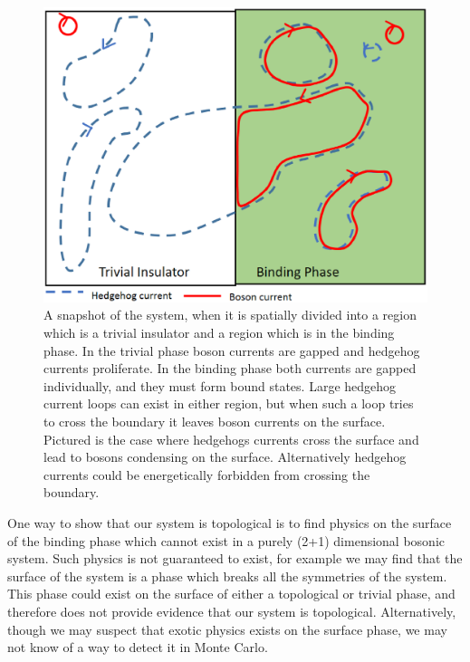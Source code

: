 \documentclass[prb,twocolumn]{revtex4-1}
\begin{document}
\begin{figure}
\includegraphics[angle=-90,width=0.9\linewidth]{figures/surface.eps}
\caption{A snapshot of the system, when it is spatially divided into a region which is a trivial insulator and a region which is in the binding phase. In the trivial phase boson currents are gapped and hedgehog currents proliferate. In the binding phase both currents are gapped individually, and they must form bound states. Large hedgehog current loops can exist in either region, but when such a loop tries to cross the boundary it leaves boson currents on the surface. Pictured is the case where hedgehogs currents cross the surface and lead to bosons condensing on the surface. Alternatively hedgehog currents could be energetically forbidden from crossing the boundary.}
\label{surface}
\end{figure}

One way to show that our system is topological is to find physics on the surface of the binding phase which cannot exist in a purely (2+1) dimensional bosonic system. 
Such physics is not guaranteed to exist, for example we may find that the surface of the system is a phase which breaks all the symmetries of the system. This phase could exist on the surface of either a topological or trivial phase, and therefore does not provide evidence that our system is topological. Alternatively, though we may suspect that exotic physics exists on the surface phase, we may not know of a way to detect it in Monte Carlo. 
\end{document}
